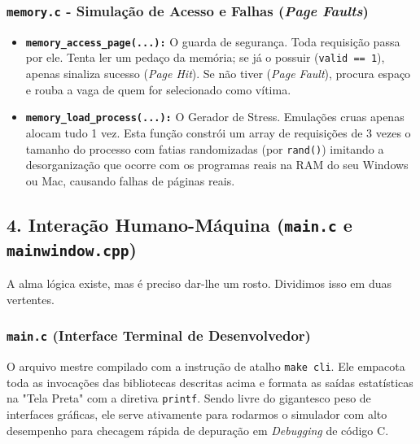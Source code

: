 \documentclass[12pt,a4paper]{article}
\begin{document}
\begin{itemize}
{\subsubsection{\texttt{memory.c} - Simulação de Acesso e Falhas (\textit{Page Faults})}
\begin{itemize}
    \item \textbf{\texttt{memory\_access\_page(...):}} O guarda de segurança. Toda requisição passa por ele. Tenta ler um pedaço da memória; se já o possuir (\texttt{valid == 1}), apenas sinaliza sucesso (\textit{Page Hit}). Se não tiver (\textit{Page Fault}), procura espaço e rouba a vaga de quem for selecionado como vítima.
    \item \textbf{\texttt{memory\_load\_process(...):}} O Gerador de Stress. Emulações cruas apenas alocam tudo 1 vez. Esta função constrói um array de requisições de 3 vezes o tamanho do processo com fatias randomizadas (por \texttt{rand()}) imitando a desorganização que ocorre com os programas reais na RAM do seu Windows ou Mac, causando falhas de páginas reais.
\end{itemize}

\subsection{4. Interação Humano-Máquina (\texttt{main.c} e \texttt{mainwindow.cpp})}
A alma lógica existe, mas é preciso dar-lhe um rosto. Dividimos isso em duas vertentes.

\subsubsection{\texttt{main.c} (Interface Terminal de Desenvolvedor)}
O arquivo mestre compilado com a instrução de atalho \texttt{make cli}. Ele empacota toda as invocações das bibliotecas descritas acima e formata as saídas estatísticas na "Tela Preta" com a diretiva \texttt{printf}. Sendo livre do gigantesco peso de interfaces gráficas, ele serve ativamente para rodarmos o simulador com alto desempenho para checagem rápida de depuração em \textit{Debugging} de código C.

}
\end{itemize}
\end{document}
